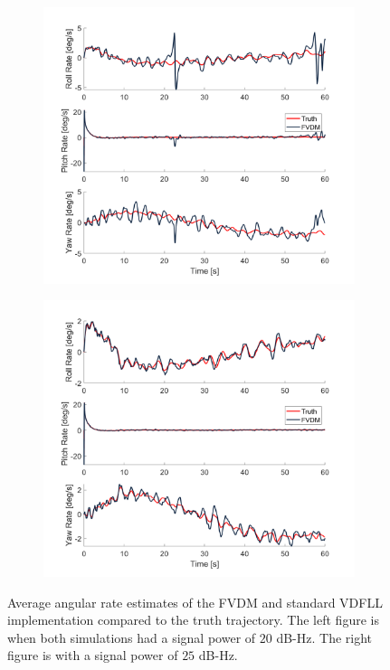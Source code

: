 \begin{figure}[!ht]
    \begin{subfigure}{.45\textwidth}
        \centering
        \includegraphics[width=1\linewidth]{Figures/dynamic/18/ANGULARRATES.png}
    \end{subfigure}
    \begin{subfigure}{.45\textwidth}
        \centering
        \includegraphics[width=1\linewidth]{Figures/dynamic/20/ANGULARRATES.png}
    \end{subfigure}
    \caption{Average angular rate estimates of the FVDM and standard VDFLL implementation compared to the truth trajectory. The left figure is when both simulations had a signal power of \(20\) dB-Hz. The right figure is with a signal power of \(25\) dB-Hz.}\label{fig:ANGRATES}
\end{figure}

